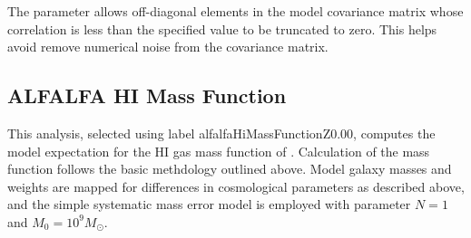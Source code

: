 The parameter {\normalfont \ttfamily [analysisMassFunctionsCorrelationTruncateLevel]} allows off-diagonal elements in the model covariance matrix whose correlation is less than the specified value to be truncated to zero. This helps avoid remove numerical noise from the covariance matrix.

\subsection{ALFALFA HI Mass Function}\label{sec:otfAnalysis:ALFALFA}

This analysis, selected using label {\normalfont \ttfamily alfalfaHiMassFunctionZ0.00}, computes the model expectation for the HI gas mass function of \cite{martin_arecibo_2010}. Calculation of the mass function follows the basic methdology outlined above. Model galaxy masses and weights are mapped for differences in cosmological parameters as described above, and the simple systematic mass error model is employed with parameter $N=1$ and $M_0=10^9M_\odot$.


